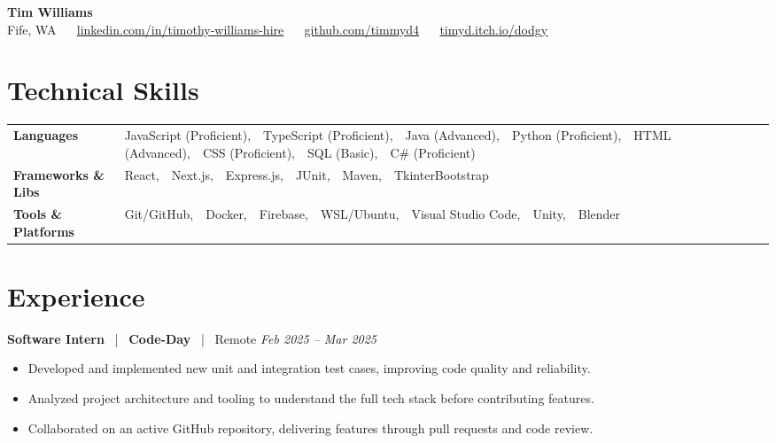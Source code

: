 \documentclass[10pt, letterpaper]{article}
\newcommand{\jobhead}[4]{%
  \vspace{5pt}%
  {\bfseries\color{dark}#1}%
  ~{\color{light}|}~%
  {\bfseries\color{navy}#2}%
  ~{\color{light}|}~%
  {\color{light}#3}%
  \hfill{\color{light}\small\textit{#4}}\\[-2pt]%
}
\newcommand{\skillrow}[2]{%
  {\bfseries #1} & #2 \\[2pt]%
}
\begin{document}

\begin{center}
  {\huge\bfseries\color{navy} Tim Williams}\\[4pt]
  {\small\color{light}
    Fife, WA
    ~\textbullet~
    \href{https://linkedin.com/in/timothy-williams-hire}{linkedin.com/in/timothy-williams-hire}
    ~\textbullet~
    \href{https://github.com/timmyd4}{github.com/timmyd4}
    ~\textbullet~
    \href{https://timyd.itch.io/dodgy}{timyd.itch.io/dodgy}
  }
\end{center}

\vspace{2pt}

\section{Technical Skills}

\begin{tabular}{@{}p{1.6in} p{5.2in}@{}}
  \skillrow{Languages}{JavaScript (Proficient),\ \ TypeScript (Proficient),\ \ Java (Advanced),\ \ Python (Proficient),\ \ HTML (Advanced),\ \ CSS (Proficient),\ \ SQL (Basic),\ \ C\# (Proficient)}
  \skillrow{Frameworks \& Libs}{React,\ \ Next.js,\ \ Express.js,\ \ JUnit,\ \ Maven,\ \ TkinterBootstrap}
  \skillrow{Tools \& Platforms}{Git/GitHub,\ \ Docker,\ \ Firebase,\ \ WSL/Ubuntu,\ \ Visual Studio Code,\ \ Unity,\ \ Blender}
\end{tabular}

\section{Experience}

\jobhead{Software Intern}{Code-Day}{Remote}{Feb 2025 – Mar 2025}
\begin{itemize}
  \item Developed and implemented new unit and integration test cases, improving code quality and reliability.
  \item Analyzed project architecture and tooling to understand the full tech stack before contributing features.
  \item Collaborated on an active GitHub repository, delivering features through pull requests and code review.
\end{itemize}
\end{document}
